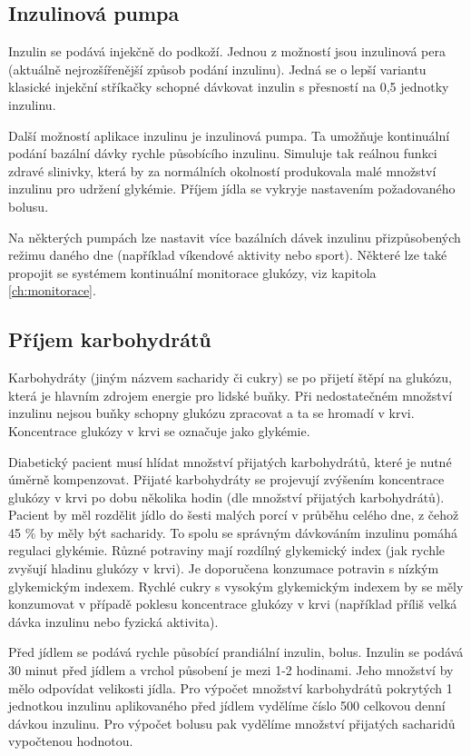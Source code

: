 \subsection{Inzulinová pumpa}
\label{ch:pumpa}

Inzulin se podává injekčně do podkoží. Jednou z možností jsou inzulinová pera (aktuálně nejrozšířenější způsob podání inzulinu). Jedná se o lepší variantu klasické injekční stříkačky schopné dávkovat inzulin s přesností na 0,5 jednotky inzulinu.

Další možností aplikace inzulinu je inzulinová pumpa. Ta umožňuje kontinuální podání bazální dávky rychle působícího inzulinu. Simuluje tak reálnou funkci zdravé slinivky, která by za normálních okolností produkovala malé množství inzulinu pro udržení glykémie. Příjem jídla se vykryje nastavením požadovaného bolusu.

Na některých pumpách lze nastavit více bazálních dávek inzulinu přizpůsobených režimu daného dne (například víkendové aktivity nebo sport). Některé lze také propojit se systémem kontinuální monitorace glukózy, viz kapitola \ref{ch:monitorace}. \cite{Diabetes.Perusicova,Diabetes.Rybka} 

\subsection{Příjem karbohydrátů}

Karbohydráty (jiným názvem sacharidy či cukry) se po přijetí štěpí na glukózu, která je hlavním zdrojem energie pro lidské buňky. Při nedostatečném množství inzulinu nejsou buňky schopny glukózu zpracovat a ta se hromadí v krvi. Koncentrace glukózy v krvi se označuje jako glykémie.

Diabetický pacient musí hlídat množství přijatých karbohydrátů, které je nutné úměrně kompenzovat. Přijaté karbohydráty se projevují zvýšením koncentrace glukózy v krvi po dobu několika hodin (dle množství přijatých karbohydrátů). Pacient by měl rozdělit jídlo do šesti malých porcí v průběhu celého dne, z čehož 45 \% by měly být sacharidy. To spolu se správným dávkováním inzulinu pomáhá regulaci glykémie. Různé potraviny mají rozdílný glykemický index (jak rychle zvyšují hladinu glukózy v krvi). Je doporučena konzumace potravin s nízkým glykemickým indexem. Rychlé cukry s vysokým glykemickým indexem by se měly konzumovat v případě poklesu koncentrace glukózy v krvi (například příliš velká dávka inzulinu nebo fyzická aktivita).

Před jídlem se podává rychle působící prandiální inzulin, bolus. Inzulin se podává 30 minut před jídlem a vrchol působení je mezi 1-2 hodinami. Jeho množství by mělo odpovídat velikosti jídla. Pro výpočet množství karbohydrátů pokrytých 1 jednotkou inzulinu aplikovaného před jídlem vydělíme číslo 500 celkovou denní dávkou inzulinu. Pro výpočet bolusu pak vydělíme množství přijatých sacharidů vypočtenou hodnotou.

